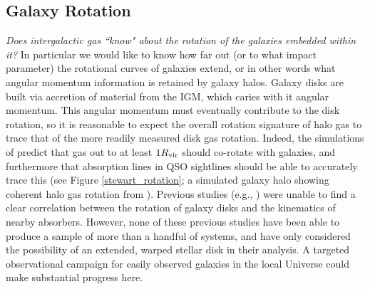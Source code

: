 
\subsection{Galaxy Rotation}
\emph{Does intergalactic gas ``know" about the rotation of the galaxies embedded within it?} In particular we would like to know how far out (or to what impact parameter) the rotational curves of galaxies extend, or in other words what angular momentum information is retained by galaxy halos. Galaxy disks are built via accretion of material from the IGM, which caries with it angular momentum. This angular momentum must eventually contribute to the disk rotation, so it is reasonable to expect the overall rotation signature of halo gas to trace that of the more readily measured disk gas rotation. Indeed, the simulations of \cite{stewart2011a, stewart2011b, stewart2013} predict that \HI gas out to at least $1 R_{\rm vir}$ should co-rotate with galaxies, and furthermore that absorption lines in QSO sightlines should be able to accurately trace this (see Figure \ref{stewart_rotation}; a simulated galaxy halo showing coherent halo gas rotation from \citealt{stewart2011a}). Previous studies (e.g., \citealt{steidel2002, cote2005, wakker2009, kacprzak2011_kinematics}) were unable to find a clear correlation between the rotation of galaxy disks and the kinematics of nearby absorbers. However, none of these previous studies have been able to produce a sample of more than a handful of systems, and have only considered the possibility of an extended, warped stellar disk in their analysis. A targeted observational campaign for easily observed galaxies in the local Universe could make substantial progress here.


